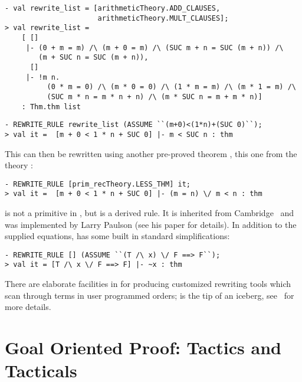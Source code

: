 \begin{session}\begin{verbatim}
- val rewrite_list = [arithmeticTheory.ADD_CLAUSES,
                      arithmeticTheory.MULT_CLAUSES];
> val rewrite_list =
    [ []
     |- (0 + m = m) /\ (m + 0 = m) /\ (SUC m + n = SUC (m + n)) /\
        (m + SUC n = SUC (m + n)),
      []
     |- !m n.
          (0 * m = 0) /\ (m * 0 = 0) /\ (1 * m = m) /\ (m * 1 = m) /\
          (SUC m * n = m * n + n) /\ (m * SUC n = m + m * n)]
    : Thm.thm list
\end{verbatim}\end{session}

\begin{session}\begin{verbatim}
- REWRITE_RULE rewrite_list (ASSUME ``(m+0)<(1*n)+(SUC 0)``);
> val it =  [m + 0 < 1 * n + SUC 0] |- m < SUC n : thm
\end{verbatim}\end{session}

\noindent
This can then be rewritten using another pre-proved theorem
, this one from the theory :

\begin{session}\begin{verbatim}
- REWRITE_RULE [prim_recTheory.LESS_THM] it;
> val it =  [m + 0 < 1 * n + SUC 0] |- (m = n) \/ m < n : thm
\end{verbatim}\end{session}

     is not a primitive in \HOL, but is a derived
    rule. It is inherited from Cambridge \LCF\ and was implemented by
    Larry Paulson (see his paper \cite{lcp_rewrite} for details). In
    addition to the supplied equations, \ml{REWRITE\_RULE} has some
    built in standard simplifications:

\begin{session}\begin{verbatim}
- REWRITE_RULE [] (ASSUME ``(T /\ x) \/ F ==> F``);
> val it = [T /\ x \/ F ==> F] |- ~x : thm
\end{verbatim}\end{session}

    There are elaborate facilities in \HOL{} for producing customized
    rewriting tools which scan through terms in user programmed
    orders; \ml{REWRITE\_RULE} is the tip of an iceberg, see
    \DESCRIPTION\ for more details.

\chapter{Goal Oriented Proof: Tactics and Tacticals}
\label{backward}\label{tactics}

